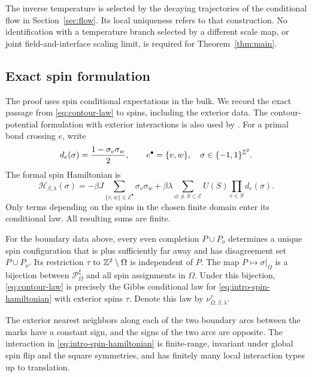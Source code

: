 The inverse temperature is selected by the decaying trajectories of the
conditional flow in Section~\ref{sec:flow}. Its local uniqueness refers to
that construction. No identification with a temperature branch selected
by a different scale map, or joint field-and-interface scaling limit,
is required for Theorem~\ref{thm:main}.

\subsection{Exact spin formulation}\label{subsec:spin-formulation}


The proof uses spin conditional expectations in the bulk. We record the
exact passage from \eqref{eq:contour-law} to spins, including the exterior
data. The contour-potential formulation with exterior interactions is
also used by \citet[Section~4]{GreenblattPeltola2024}. For a primal bond crossing \(e\), write
\[
 d_e(\sigma)=\frac{1-\sigma_v\sigma_w}{2},
 \qquad e^\bullet=\{v,w\},\quad \sigma\in\{-1,1\}^{\mathbb Z^2}.
\]
The formal spin Hamiltonian is
\begin{equation}\label{eq:intro-spin-hamiltonian}
 \mathcal H_{\beta,\lambda}(\sigma)
 =
 -\beta J\sum_{\{v,w\}\in\mathcal E^\bullet}\sigma_v\sigma_w
 +\beta\lambda
  \sum_{\varnothing\ne S\subset\mathcal E}
        U(S)\prod_{e\in S}d_e(\sigma).
\end{equation}
Only terms depending on the spins in the chosen finite domain enter its
conditional law. All resulting sums are finite.

\begin{lemma}\label{lem:contour-spin}
For the boundary data above, every even completion \(P\cup P_o\)
determines a unique spin configuration that is plus sufficiently far
away and has disagreement set \(P\cup P_o\). Its restriction
\(\tau\) to \(\mathbb Z^2\setminus\Omega\) is independent of \(P\).
The map \(P\mapsto\sigma|_\Omega\) is a bijection between
\(\mathcal P_\Omega^\xi\) and all spin assignments in \(\Omega\).
Under this bijection, \eqref{eq:contour-law} is precisely the Gibbs
conditional law for \eqref{eq:intro-spin-hamiltonian} with exterior
spins \(\tau\). Denote this law by
\(\nu_{\Omega,\beta,\lambda}^{\tau}\).

The exterior nearest neighbors along each of the two boundary arcs
between the marks have a constant sign, and the signs of the two arcs
are opposite. The interaction in
\eqref{eq:intro-spin-hamiltonian} is finite-range, invariant under global
spin flip and the square symmetries, and has finitely many local
interaction types up to translation.
\end{lemma}

